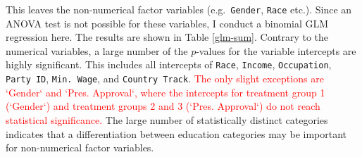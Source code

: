 \documentclass[12pt,econ]{sources/authesis}
\begin{document}
This leaves the non-numerical factor variables (e.g.~\texttt{Gender}, \texttt{Race} etc.). Since an ANOVA test is not possible for these variables, I conduct a binomial GLM regression here. The results are shown in Table \ref{glm-sum}. Contrary to the numerical variables, a large number of the \(p\)-values for the variable intercepts are highly significant. This includes all intercepts of \texttt{Race}, \texttt{Income}, \texttt{Occupation}, \texttt{Party\ ID}, \texttt{Min.\ Wage}, and \texttt{Country\ Track}. \textcolor{red}{The only slight exceptions are `Gender` and `Pres. Approval`, where the intercepts for treatment group 1 (`Gender`) and treatment groups 2 and 3 (`Pres. Approval`) do not reach statistical significance.} The large number of statistically distinct categories indicates that a differentiation between education categories may be important for non-numerical factor variables.

\ssp
\end{document}

